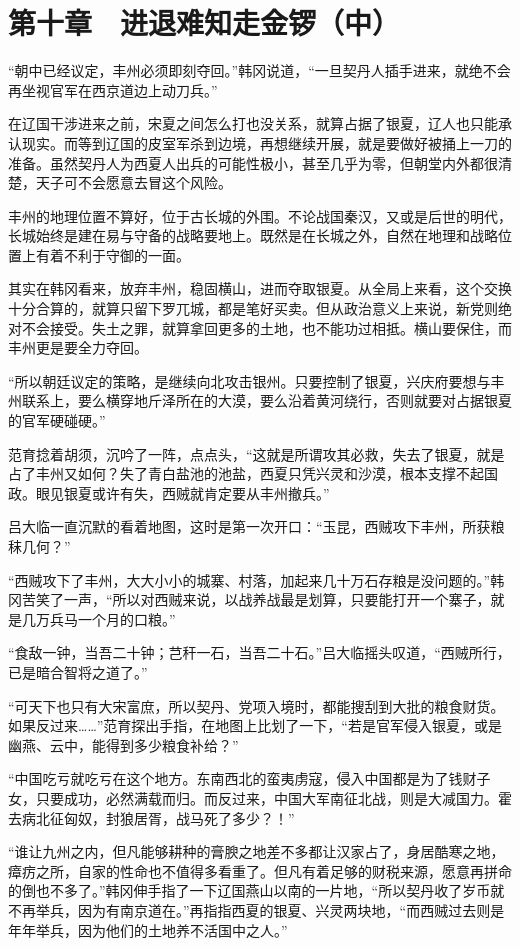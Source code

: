 \section{第十章　进退难知走金锣（中）}

“朝中已经议定，丰州必须即刻夺回。”韩冈说道，“一旦契丹人插手进来，就绝不会再坐视官军在西京道边上动刀兵。”

在辽国干涉进来之前，宋夏之间怎么打也没关系，就算占据了银夏，辽人也只能承认现实。而等到辽国的皮室军杀到边境，再想继续开展，就是要做好被捅上一刀的准备。虽然契丹人为西夏人出兵的可能性极小，甚至几乎为零，但朝堂内外都很清楚，天子可不会愿意去冒这个风险。

丰州的地理位置不算好，位于古长城的外围。不论战国秦汉，又或是后世的明代，长城始终是建在易与守备的战略要地上。既然是在长城之外，自然在地理和战略位置上有着不利于守御的一面。

其实在韩冈看来，放弃丰州，稳固横山，进而夺取银夏。从全局上来看，这个交换十分合算的，就算只留下罗兀城，都是笔好买卖。但从政治意义上来说，新党则绝对不会接受。失土之罪，就算拿回更多的土地，也不能功过相抵。横山要保住，而丰州更是要全力夺回。

“所以朝廷议定的策略，是继续向北攻击银州。只要控制了银夏，兴庆府要想与丰州联系上，要么横穿地斤泽所在的大漠，要么沿着黄河绕行，否则就要对占据银夏的官军硬碰硬。”

范育捻着胡须，沉吟了一阵，点点头，“这就是所谓攻其必救，失去了银夏，就是占了丰州又如何？失了青白盐池的池盐，西夏只凭兴灵和沙漠，根本支撑不起国政。眼见银夏或许有失，西贼就肯定要从丰州撤兵。”

吕大临一直沉默的看着地图，这时是第一次开口：“玉昆，西贼攻下丰州，所获粮秣几何？”

“西贼攻下了丰州，大大小小的城寨、村落，加起来几十万石存粮是没问题的。”韩冈苦笑了一声，“所以对西贼来说，以战养战最是划算，只要能打开一个寨子，就是几万兵马一个月的口粮。”

“食敌一钟，当吾二十钟；芑秆一石，当吾二十石。”吕大临摇头叹道，“西贼所行，已是暗合智将之道了。”

“可天下也只有大宋富庶，所以契丹、党项入境时，都能搜刮到大批的粮食财货。如果反过来……”范育探出手指，在地图上比划了一下，“若是官军侵入银夏，或是幽燕、云中，能得到多少粮食补给？”

“中国吃亏就吃亏在这个地方。东南西北的蛮夷虏寇，侵入中国都是为了钱财子女，只要成功，必然满载而归。而反过来，中国大军南征北战，则是大减国力。霍去病北征匈奴，封狼居胥，战马死了多少？！”

“谁让九州之内，但凡能够耕种的膏腴之地差不多都让汉家占了，身居酷寒之地，瘴疠之所，自家的性命也不值得多看重了。但凡有着足够的财税来源，愿意再拼命的倒也不多了。”韩冈伸手指了一下辽国燕山以南的一片地，“所以契丹收了岁币就不再举兵，因为有南京道在。”再指指西夏的银夏、兴灵两块地，“而西贼过去则是年年举兵，因为他们的土地养不活国中之人。”

